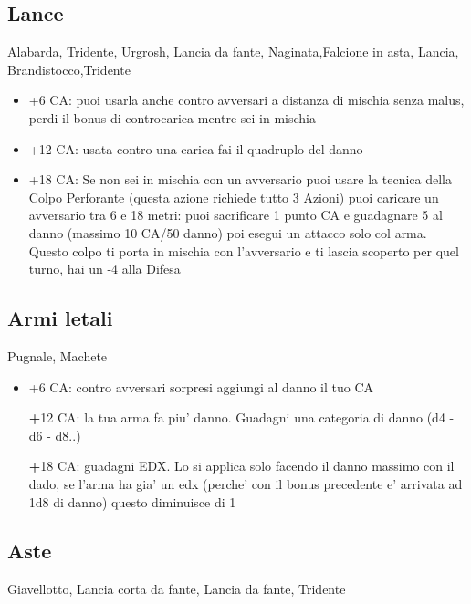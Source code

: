 \documentclass[a4paper,11pt,twoside,openany]{dndbook}
\begin{document}
\subsection{Lance} Alabarda, Tridente, Urgrosh, Lancia da fante, Naginata,Falcione in asta, Lancia, Brandistocco,Tridente

\begin{itemize}
\item +6 CA: puoi usarla anche contro avversari a distanza di mischia senza malus, perdi il bonus di controcarica mentre sei in mischia

\item +12 CA: usata contro una carica fai il quadruplo del danno

\item +18 CA: Se non sei in mischia con un avversario puoi usare la tecnica della Colpo Perforante (questa azione richiede tutto 3 Azioni) puoi caricare un avversario tra 6 e 18 metri: puoi sacrificare 1 punto CA e guadagnare 5 al danno (massimo 10 CA/50 danno) poi esegui un attacco solo col arma. Questo colpo ti porta in mischia con l'avversario e ti lascia scoperto per quel turno, hai un -4 alla Difesa

\end{itemize}

\subsection{Armi letali} Pugnale, Machete

\begin{itemize}

\item +6 CA: contro avversari sorpresi aggiungi al danno il tuo CA

\textbf +12 CA: la tua arma fa piu' danno. Guadagni una categoria di danno (d4 - d6 - d8..)

\textbf +18 CA: guadagni EDX. Lo si applica solo facendo il danno massimo con il dado, se l'arma ha gia' un edx (perche' con il bonus precedente e' arrivata ad 1d8 di danno)
questo diminuisce di 1

\end{itemize}

\subsection{Aste} Giavellotto, Lancia corta da fante, Lancia da fante, Tridente
\end{document}
